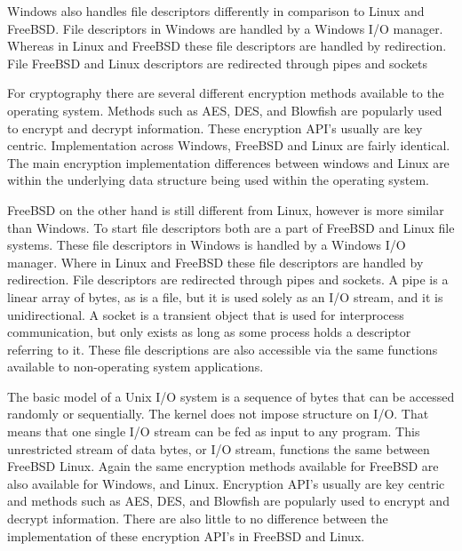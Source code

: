 \documentclass[letterpaper,10pt,draftclsnofoot,onecolumn]{IEEEtran}
\begin{document}
Windows also handles file descriptors differently in comparison to Linux and FreeBSD. 
File descriptors in Windows are handled by a Windows I/O manager. Whereas in Linux and FreeBSD these file descriptors are handled by redirection. File FreeBSD and Linux descriptors are redirected through pipes and sockets


For cryptography there are several different encryption methods available to the operating system. Methods such as AES, DES, and Blowfish are popularly used to encrypt and decrypt information. These encryption API's usually are key centric. Implementation across Windows, FreeBSD and Linux are fairly identical. The main encryption implementation differences between windows and Linux are within the underlying data structure being used within the operating system. 


 \cite{love2010}







FreeBSD on the other hand is still different from Linux, however is more similar than Windows. To start file descriptors both are a part of FreeBSD and Linux file systems. These file descriptors in Windows is handled by a Windows I/O manager. Where in Linux and FreeBSD these file descriptors are handled by redirection. File descriptors are redirected through pipes and sockets. A pipe is a linear array of bytes, as is a file, but it is used solely as an I/O stream, and it is unidirectional. A socket is a transient object that is used for interprocess communication, but only exists as long as some process holds a descriptor referring to it.
\cite{BSD1}
These file descriptions are also accessible via the same functions available to non-operating system applications. 

The basic model of a Unix I/O system is a sequence of bytes that can be accessed randomly or sequentially. The kernel does not impose structure on I/O. That means that one single I/O stream can be fed as input to any program. This unrestricted stream of data bytes, or I/O stream, functions the same between FreeBSD Linux.
\cite{BSD1}
Again the same encryption methods available for FreeBSD are also available for Windows, and Linux. Encryption API's usually are key centric and methods such as AES, DES, and Blowfish are popularly used to encrypt and decrypt information. There are also little to no difference between the implementation of these encryption API's in FreeBSD and Linux.
\end{document}
